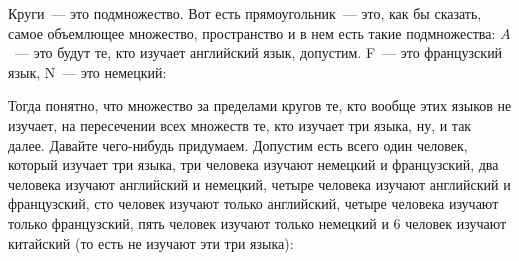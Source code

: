 \documentclass[russian]{lecture-notes}
\theoremstyle{definition}
\begin{document}
\begin{enumerate}
\begin{problem}
			\begin{figure}[H]
				\centering
			\end{figure}
			
			Круги~--- это подмножество. Вот есть прямоугольник~--- это, как бы сказать, самое объемлющее множество, пространство и в нем есть такие подмножества: $A$~--- это будут те, кто изучает английский язык, допустим. F~--- это французский язык, N~--- это немецкий:
			
			\begin{figure}[H]
				\centering
			\end{figure}
			
			Тогда понятно, что множество за пределами кругов те, кто вообще этих языков не изучает, на пересечении всех множеств те, кто изучает три языка, ну, и так далее. Давайте чего-нибудь придумаем. Допустим есть всего один человек, который изучает три языка, три человека изучают немецкий и французский, два человека изучают английский и немецкий, четыре человека изучают английский и французский, сто человек изучают только английский, четыре человека изучают только французский, пять человек изучают только немецкий и 6 человек изучают китайский (то есть не изучают эти три языка):
			
			\begin{figure}[H]
				\centering
			\end{figure}
		

\end{problem}
\end{enumerate}
\end{document}
